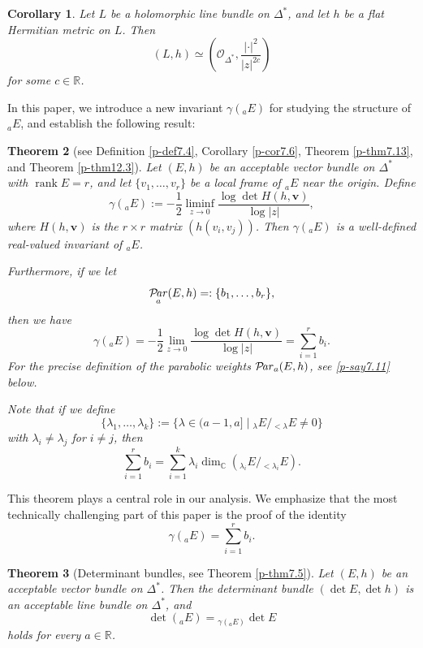\documentclass[12pt,twoside]{amsart}
\DeclareMathOperator{\rank}{rank}
\DeclareMathOperator{\Par}{\mathcal{P}\!\it{ar}}
\newtheorem{thm}{Theorem}[section]
\newtheorem{cor}[thm]{Corollary}
\theoremstyle{definition}
\begin{document}
\begin{cor}\label{p-cor1.8}
Let $L$ be a holomorphic line bundle on 
$\Delta^*$, and let $h$ be a flat Hermitian metric on $L$. Then
\[
(L, h) \simeq \left( \mathcal{O}_{\Delta^*}, 
\frac{|\cdot|^2}{|z|^{2c}} \right)
\]
for some $c \in \mathbb{R}$.
\end{cor}

In this paper, we introduce a new invariant 
$\gamma({}_a E)$ for studying the structure of 
${}_a E$, and establish the following result:

\begin{thm}[see Definition \ref{p-def7.4}, Corollary \ref{p-cor7.6}, 
Theorem \ref{p-thm7.13}, and Theorem \ref{p-thm12.3}]\label{p-thm1.9}
Let $(E, h)$ be an acceptable vector 
bundle on $\Delta^*$ with $\rank E 
= r$, and let $\{v_1, \ldots, v_r\}$ be a local frame of ${}_a E$ near the origin. Define
\[
\gamma({}_a E) := -\frac{1}{2} \liminf_{z \to 0} \frac{\log \det H(h, \bm v)}{\log |z|},
\]
where $H(h, \bm v)$ is the $r \times r$ matrix 
$\left( h(v_i, v_j) \right)$. Then 
$\gamma({}_a E)$ is a well-defined real-valued invariant of ${}_a E$.

Furthermore, if we let
\[
\Par_a(E, h) =: \{b_1, \ldots, b_r\},
\]
then we have
\[
\gamma({}_a E) = -\frac{1}{2} 
\lim_{z \to 0} \frac{\log \det H(h, \bm v)}{\log |z|} = \sum_{i=1}^r b_i.
\] 
For the precise definition of the parabolic 
weights $\Par_a(E, h)$, see \ref{p-say7.11} below.


Note that if we define 
\[
\{\lambda_1, \ldots, \lambda_k\} 
:= \{ \lambda \in (a-1, a] \mid {}_\lambda E / {}_{<\lambda} E \ne 0 \}
\]
with $\lambda_i \ne \lambda_j$ for $i \ne j$, then
\[
\sum_{i=1}^r b_i = \sum_{i=1}^k \lambda_i 
\dim_{\mathbb{C}} \left( {}_{\lambda_i} E / {}_{<\lambda_i} E \right).
\]
\end{thm}

This theorem plays a central role in our analysis.
We emphasize that the most 
technically challenging part of this paper is the proof of the identity 
\[\gamma ({}_a E) =
\sum 
_{i=1}^rb_i.
\] 

\begin{thm}[Determinant bundles, see Theorem \ref{p-thm7.5}]\label{p-thm1.10}
Let $(E, h)$ be an acceptable vector bundle on $\Delta^*$. Then 
the determinant bundle $(\det E, \det h)$ is an acceptable 
line bundle on $\Delta^*$, and
\[
\det({}_a E) = {}_{\gamma({}_a E)} \det E
\]
holds for every $a \in \mathbb{R}$.
\end{thm}
\end{document}
